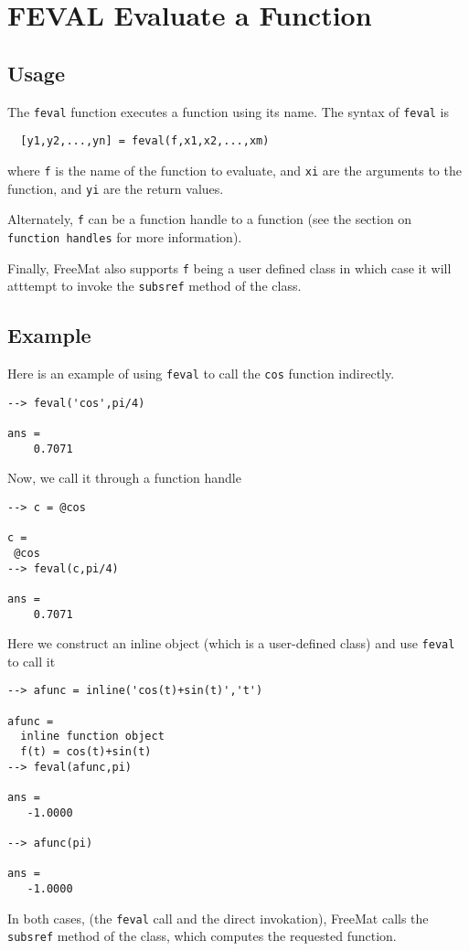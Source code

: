 \section{FEVAL Evaluate a Function}

\subsection{Usage}

The \verb|feval| function executes a function using its name.
The syntax of \verb|feval| is
\begin{verbatim}
  [y1,y2,...,yn] = feval(f,x1,x2,...,xm)
\end{verbatim}
where \verb|f| is the name of the function to evaluate, and
\verb|xi| are the arguments to the function, and \verb|yi| are the
return values.

Alternately, \verb|f| can be a function handle to a function
(see the section on \verb|function handles| for more information).

Finally, FreeMat also supports \verb|f| being a user defined class
in which case it will atttempt to invoke the \verb|subsref| method
of the class.
\subsection{Example}

Here is an example of using \verb|feval| to call the \verb|cos| 
function indirectly.
\begin{verbatim}
--> feval('cos',pi/4)

ans = 
    0.7071 
\end{verbatim}
Now, we call it through a function handle
\begin{verbatim}
--> c = @cos

c = 
 @cos
--> feval(c,pi/4)

ans = 
    0.7071 
\end{verbatim}
Here we construct an inline object (which is a user-defined class)
and use \verb|feval| to call it
\begin{verbatim}
--> afunc = inline('cos(t)+sin(t)','t')

afunc = 
  inline function object
  f(t) = cos(t)+sin(t)
--> feval(afunc,pi)

ans = 
   -1.0000 

--> afunc(pi)

ans = 
   -1.0000 
\end{verbatim}
In both cases, (the \verb|feval| call and the direct invokation), FreeMat
calls the \verb|subsref| method of the class, which computes the requested 
function.
